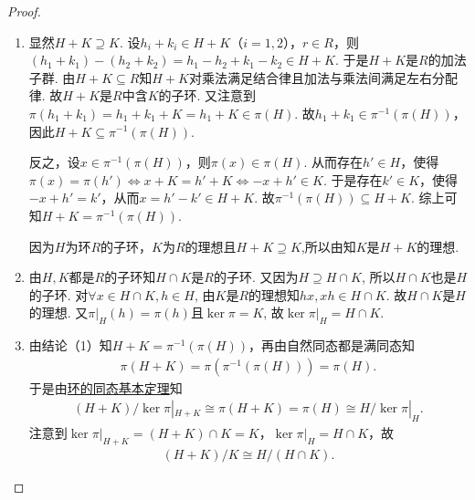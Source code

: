 \documentclass[../../main.tex]{subfiles}%
\begin{document}
\begin{proof}
\begin{enumerate}[(1)]
\item 显然$H+K \supseteq K$. 设$h_i + k_i \in H+K$（$i=1,2$），$r \in R$，则$(h_1 + k_1) - (h_2 + k_2) = h_1 - h_2 + k_1 - k_2 \in H+K$.
于是$H+K$是$R$的加法子群. 由$H+K \subseteq R$知$H+K$对乘法满足结合律且加法与乘法间满足左右分配律. 故$H+K$是$R$中含$K$的子环. 又注意到
$\pi(h_1 + k_1) = h_1 + k_1 + K = h_1 + K \in \pi(H)$.
故$h_1 + k_1 \in \pi^{-1}(\pi(H))$，因此$H+K \subseteq \pi^{-1}(\pi(H))$.

反之，设$x \in \pi^{-1}(\pi(H))$，则$\pi(x) \in \pi(H)$. 从而存在$h' \in H$，使得
$\pi(x) = \pi(h') \Longleftrightarrow x + K = h' + K \Longleftrightarrow -x + h' \in K$.
于是存在$k' \in K$，使得$-x + h' = k'$，从而$x = h' - k' \in H+K$. 故$\pi^{-1}(\pi(H)) \subseteq H+K$. 综上可知$H+K = \pi^{-1}(\pi(H))$.

因为$H$为环$R$的子环，$K$为$R$的理想且$H+K\supseteq K$,所以由知$K$是$H+K$的理想.

\item 由$H,K$都是$R$的子环知$H\cap K$是$R$的子环. 又因为$H\supseteq H\cap K$, 所以$H\cap K$也是$H$的子环. 对$\forall x\in H\cap K,h\in H$, 由$K$是$R$的理想知$hx,xh\in H\cap K$. 故$H\cap K$是$H$的理想.
又$\pi|_H(h) = \pi(h)$且$\ker\pi = K$, 故$\ker\pi|_H = H\cap K.$

\item 由结论（1）知$H+K=\pi^{-1}(\pi(H))$，再由自然同态都是满同态知
\begin{align*}
\pi(H+K) = \pi(\pi^{-1}(\pi(H))) = \pi(H).
\end{align*}
于是由\hyperref[theorem:环的同态基本定理]{环的同态基本定理}知
\begin{align*}
(H+K)/\ker\pi|_{H+K} \cong \pi(H+K) = \pi(H) \cong H/\ker\pi|_H.
\end{align*}
注意到$\ker\pi|_{H+K} = (H+K)\cap K = K$，$\ker\pi|_H = H\cap K$，故
\begin{align*}
(H+K)/K \cong H/(H\cap K).
\end{align*}
\end{enumerate}
\end{proof}
\end{document}

